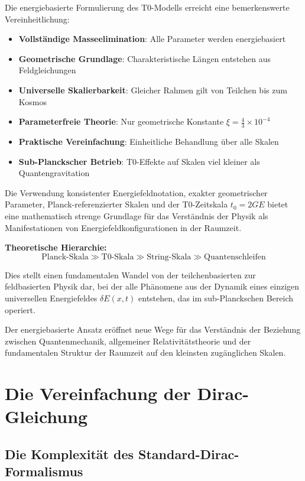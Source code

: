 \documentclass[12pt,a4paper]{report}
\newcommand{\tzero}{t_0}                  %
\begin{document}
	Die energiebasierte Formulierung des T0-Modells erreicht eine bemerkenswerte Vereinheitlichung:
	
	\begin{itemize}
		\item \textbf{Vollständige Masseelimination}: Alle Parameter werden energiebasiert
		\item \textbf{Geometrische Grundlage}: Charakteristische Längen entstehen aus Feldgleichungen
		\item \textbf{Universelle Skalierbarkeit}: Gleicher Rahmen gilt von Teilchen bis zum Kosmos
		\item \textbf{Parameterfreie Theorie}: Nur geometrische Konstante $\xi = \frac{4}{3} \times 10^{-4}$
		\item \textbf{Praktische Vereinfachung}: Einheitliche Behandlung über alle Skalen
		\item \textbf{Sub-Planckscher Betrieb}: T0-Effekte auf Skalen viel kleiner als Quantengravitation
	\end{itemize}
	
	Die Verwendung konsistenter Energiefeldnotation, exakter geometrischer Parameter, Planck-referenzierter Skalen und der T0-Zeitskala $\tzero = 2GE$ bietet eine mathematisch strenge Grundlage für das Verständnis der Physik als Manifestationen von Energiefeldkonfigurationen in der Raumzeit.
	
	\textbf{Theoretische Hierarchie:}
	\begin{equation}
		\text{Planck-Skala} \gg \text{T0-Skala} \gg \text{String-Skala} \gg \text{Quantenschleifen}
	\end{equation}
	
	Dies stellt einen fundamentalen Wandel von der teilchenbasierten zur feldbasierten Physik dar, bei der alle Phänomene aus der Dynamik eines einzigen universellen Energiefeldes $\delta E(x,t)$ entstehen, das im sub-Planckschen Bereich operiert.
	
	Der energiebasierte Ansatz eröffnet neue Wege für das Verständnis der Beziehung zwischen Quantenmechanik, allgemeiner Relativitätstheorie und der fundamentalen Struktur der Raumzeit auf den kleinsten zugänglichen Skalen.
	\chapter{Die Vereinfachung der Dirac-Gleichung}
	\label{chap:dirac_simplification}
	
	\section{Die Komplexität des Standard-Dirac-Formalismus}
	\label{sec:dirac_complexity}
	
\end{document}
